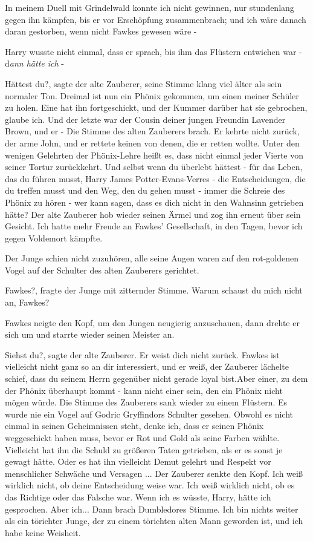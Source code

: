 \glqq In meinem Duell mit Grindelwald konnte ich nicht gewinnen, nur stundenlang
gegen ihn kämpfen, bis er vor Erschöpfung zusammenbrach; und ich wäre danach
daran gestorben, wenn nicht Fawkes gewesen wäre -

Harry wusste nicht einmal, dass er sprach, bis ihm das Flüstern entwichen war -
\glqq d\emph{ann hätte ich} -\grqq{}

\glqq Hättest du?\grqq{}, sagte der alte Zauberer, seine Stimme klang viel älter
als sein normaler Ton. \glqq Dreimal ist nun ein Phönix gekommen, um einen
meiner Schüler zu holen. Eine hat ihn fortgeschickt, und der Kummer darüber hat
sie gebrochen, glaube ich. Und der letzte war der Cousin deiner jungen Freundin
Lavender Brown, und er -\grqq{} Die Stimme des alten Zauberers brach. \glqq Er
kehrte nicht zurück, der arme John, und er rettete keinen von denen, die er
retten wollte. Unter den wenigen Gelehrten der Phönix-Lehre heißt es, dass nicht
einmal jeder Vierte von seiner Tortur zurückkehrt. Und selbst wenn du überlebt
hättest - für das Leben, das du führen musst, Harry James Potter-Evans-Verres -
die Entscheidungen, die du treffen musst und den Weg, den du gehen musst - immer
die Schreie des Phönix zu hören - wer kann sagen, dass es dich nicht in den
Wahnsinn getrieben hätte?\grqq{} Der alte Zauberer hob wieder seinen Ärmel und
zog ihn erneut über sein Gesicht. \glqq Ich hatte mehr Freude an Fawkes'
Gesellschaft, in den Tagen, bevor ich gegen Voldemort kämpfte.\grqq{}

Der Junge schien nicht zuzuhören, alle seine Augen waren auf den rot-goldenen
Vogel auf der Schulter des alten Zauberers gerichtet.

\glqq Fawkes?\grqq{}, fragte der Junge mit zitternder Stimme. \glqq Warum
schaust du mich nicht an, Fawkes?\grqq{}

Fawkes neigte den Kopf, um den Jungen neugierig anzuschauen, dann drehte er sich
um und starrte wieder seinen Meister an.

\glqq Siehst du?\grqq{}, sagte der alte Zauberer. \glqq Er weist dich nicht
zurück. Fawkes ist vielleicht nicht ganz so an dir interessiert, und er
weiß\grqq{}, der Zauberer lächelte schief, \glqq dass du seinem Herrn gegenüber
nicht gerade loyal bist.Aber einer, zu dem der Phönix überhaupt kommt - kann
nicht einer sein, den ein Phönix nicht mögen würde.\grqq{} Die Stimme des
Zauberers sank wieder zu einem Flüstern. \glqq Es wurde nie ein Vogel auf Godric
Gryffindors Schulter gesehen. Obwohl es nicht einmal in seinen Geheimnissen
steht, denke ich, dass er seinen Phönix weggeschickt haben muss, bevor er Rot
und Gold als seine Farben wählte. Vielleicht hat ihn die Schuld zu größeren
Taten getrieben, als er es sonst je gewagt hätte. Oder es hat ihn vielleicht
Demut gelehrt und Respekt vor menschlicher Schwäche und Versagen ...\grqq{} Der
Zauberer senkte den Kopf. \glqq Ich weiß wirklich nicht, ob deine Entscheidung
weise war. Ich weiß wirklich nicht, ob es das Richtige oder das Falsche war.
Wenn ich es wüsste, Harry, hätte ich gesprochen. Aber ich...\grqq{} Dann brach
Dumbledores Stimme. \glqq Ich bin nichts weiter als ein törichter Junge, der zu
einem törichten alten Mann geworden ist, und ich habe keine Weisheit.\grqq{}

